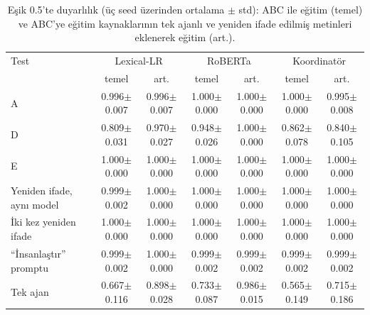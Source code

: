 \begin{table}[t]
\centering
\footnotesize
\caption{Eşik 0.5'te duyarlılık (üç seed üzerinden ortalama $\pm$ std): ABC ile eğitim (temel) ve ABC'ye eğitim kaynaklarının tek ajanlı ve yeniden ifade edilmiş metinleri eklenerek eğitim (art.).}
\label{tab:augmented}
\begin{tabular}{lcccccc}
\toprule
Test & \multicolumn{2}{c}{Lexical-LR} & \multicolumn{2}{c}{RoBERTa} & \multicolumn{2}{c}{Koordinatör} \\
 & temel & art. & temel & art. & temel & art. \\
\midrule
A & 0.996$\pm$0.007 & 0.996$\pm$0.007 & 1.000$\pm$0.000 & 1.000$\pm$0.000 & 1.000$\pm$0.000 & 0.995$\pm$0.008 \\
D & 0.809$\pm$0.031 & 0.970$\pm$0.027 & 0.948$\pm$0.026 & 1.000$\pm$0.000 & 0.862$\pm$0.078 & 0.840$\pm$0.105 \\
E & 1.000$\pm$0.000 & 1.000$\pm$0.000 & 1.000$\pm$0.000 & 1.000$\pm$0.000 & 1.000$\pm$0.000 & 1.000$\pm$0.000 \\
Yeniden ifade, aynı model & 0.999$\pm$0.002 & 1.000$\pm$0.000 & 1.000$\pm$0.000 & 1.000$\pm$0.000 & 1.000$\pm$0.000 & 1.000$\pm$0.000 \\
İki kez yeniden ifade & 1.000$\pm$0.000 & 1.000$\pm$0.000 & 1.000$\pm$0.000 & 1.000$\pm$0.000 & 1.000$\pm$0.000 & 1.000$\pm$0.000 \\
``İnsanlaştır'' promptu & 0.999$\pm$0.002 & 1.000$\pm$0.000 & 0.999$\pm$0.002 & 0.999$\pm$0.002 & 0.999$\pm$0.002 & 0.999$\pm$0.002 \\
Tek ajan & 0.667$\pm$0.116 & 0.898$\pm$0.028 & 0.733$\pm$0.087 & 0.986$\pm$0.015 & 0.565$\pm$0.149 & 0.715$\pm$0.186 \\
\bottomrule
\end{tabular}
\end{table}
